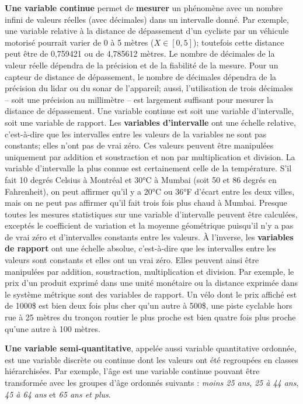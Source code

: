\documentclass[
  11pt,
  french,
]{book}
\begin{document}
\textbf{Une variable continue} permet de \textbf{mesurer} un phénomène avec un nombre infini de valeurs réelles (avec décimales) dans un intervalle donné. Par exemple, une variable relative à la distance de dépassement d'un cycliste par un véhicule motorisé pourrait varier de 0 à 5 mètres (\(X \in \left[0,5\right]\)); toutefois cette distance peut être de 0,759421 ou de 4,785612 mètres. Le nombre de décimales de la valeur réelle dépendra de la précision et de la fiabilité de la mesure. Pour un capteur de distance de dépassement, le nombre de décimales dépendra de la précision du lidar ou du sonar de l'appareil; aussi, l'utilisation de trois décimales -- soit une précision au millimètre -- est largement suffisant pour mesurer la distance de dépassement. Une variable continue est soit une variable d'intervalle, soit une variable de rapport. Les \textbf{variables d'intervalle} ont une échelle relative, c'est-à-dire que les intervalles entre les valeurs de la variables ne sont pas constants; elles n'ont pas de vrai zéro. Ces valeurs peuvent être manipulées uniquement par addition et soustraction et non par multiplication et division. La variable d'intervalle la plus connue est certainement celle de la température. S'il fait 10 degrés Celsius à Montréal et 30°C à Mumbai (soit 50 et 86 degrés en Fahrenheit), on peut affirmer qu'il y a 20°C ou 36°F d'écart entre les deux villes, mais on ne peut pas affirmer qu'il fait trois fois plus chaud à Mumbai. Presque toutes les mesures statistiques sur une variable d'intervalle peuvent être calculées, exceptés le coefficient de variation et la moyenne géométrique puisqu'il n'y a pas de vrai zéro et d'intervalles constants entre les valeurs. À l'inverse, les \textbf{variables de rapport} ont une échelle absolue, c'est-à-dire que les intervalles entre les valeurs sont constants et elles ont un vrai zéro. Elles peuvent ainsi être manipulées par addition, soustraction, multiplication et division. Par exemple, le prix d'un produit exprimé dans une unité monétaire ou la distance exprimée dans le système métrique sont des variables de rapport. Un vélo dont le prix affiché est de 1000\$ est bien deux fois plus cher qu'un autre à 500\$, une piste cyclable hors rue à 25 mètres du tronçon routier le plus proche est bien quatre fois plus proche qu'une autre à 100 mètres.

\textbf{Une variable semi-quantitative}, appelée aussi variable quantitative ordonnée, est une variable discrète ou continue dont les valeurs ont été regroupées en classes hiérarchisées. Par exemple, l'âge est une variable continue pouvant être transformée avec les groupes d'âge ordonnés suivants : \emph{moins 25 ans}, \emph{25 à 44 ans}, \emph{45 à 64 ans} et \emph{65 ans et plus}.
\end{document}
